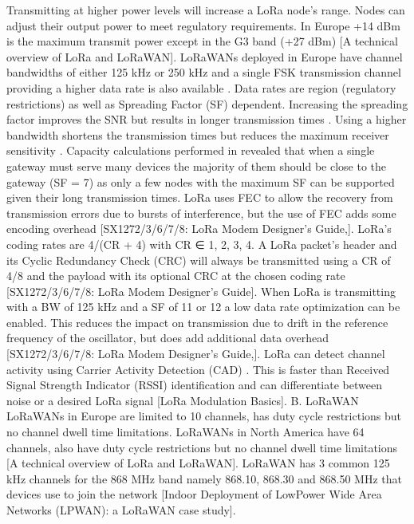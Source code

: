 Transmitting at higher power levels will increase a LoRa node’s range.
Nodes can adjust their output power to meet regulatory requirements.
In Europe +14 dBm is the maximum transmit power except in the G3 band (+27 dBm) [A technical overview of LoRa and LoRaWAN].
LoRaWANs deployed in Europe have channel bandwidths of either 125 kHz or 250 kHz and a single FSK transmission channel providing a higher data rate is also available \cite{wixted_evaluation_2016}.
Data rates are region (regulatory restrictions) as well as Spreading Factor (SF) dependent.
Increasing the spreading factor improves the SNR but results in longer transmission times \cite{bor_lora_nodate}.
Using a higher bandwidth shortens the transmission times but reduces the maximum receiver sensitivity \cite{bor_lora_2016}.
Capacity calculations performed in \cite{mikhaylov_analysis_2016} revealed that when a single gateway must serve many devices the majority of them should be close to the gateway (SF = 7) as only a few nodes with the maximum SF can be supported given their long transmission times.
LoRa uses FEC to allow the recovery from transmission errors due to bursts of interference,
	but the use of FEC adds some encoding overhead [SX1272/3/6/7/8:
	LoRa Modem Designer’s Guide,].
LoRa’s coding rates are 4/(CR + 4) with CR ∈ {1, 2, 3, 4}.
A LoRa packet’s header and its Cyclic Redundancy Check (CRC) will always be transmitted using a CR of 4/8 and the payload with its optional CRC at the chosen coding rate [SX1272/3/6/7/8:
	LoRa Modem Designer’s Guide].
When LoRa is transmitting with a BW of 125 kHz and a SF of 11 or 12 a low data rate optimization can be enabled.
This reduces the impact on transmission due to drift in the reference frequency of the oscillator,
	but does add additional data overhead [SX1272/3/6/7/8:
	LoRa Modem Designer’s Guide,].
LoRa can detect channel activity using Carrier Activity Detection (CAD) \cite{bor_lora_nodate}.
This is faster than Received Signal Strength Indicator (RSSI) identification and can differentiate between noise or a desired LoRa signal [LoRa Modulation Basics].
B.
LoRaWAN LoRaWANs in Europe are limited to 10 channels,
	has duty cycle restrictions but no channel dwell time limitations.
LoRaWANs in North America have 64 channels,
	also have duty cycle restrictions but no channel dwell time limitations [A technical overview of LoRa and LoRaWAN].
LoRaWAN has 3 common 125 kHz channels for the 868 MHz band namely 868.10, 868.30 and 868.50 MHz that devices use to join the network [Indoor Deployment of LowPower Wide Area Networks (LPWAN):
	a LoRaWAN case study].
